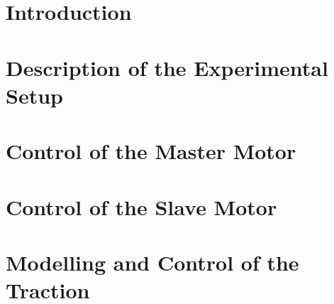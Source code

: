 



\setcounter{page}{2}
\tableofcontents

\hypersetup{allcolors = link}
\chapter{Introduction}


\chapter{Description of the Experimental Setup}
\label{chap:setup}


\chapter{Control of the Master Motor}
\label{chap:masterMotor}


\chapter{Control of the Slave Motor}
\label{chap:slaveMotor}


\chapter{Modelling and Control of the Traction}
\label{chap:traction}



